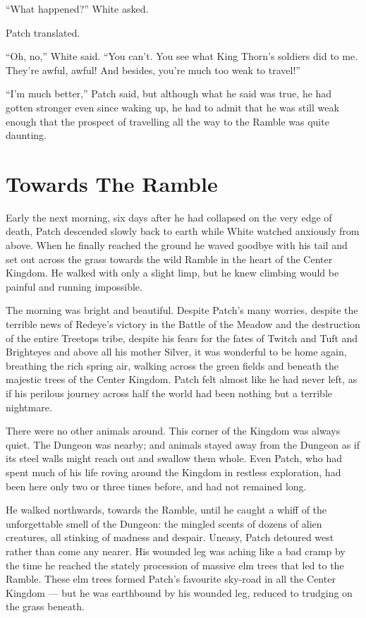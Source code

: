 \documentclass[ebook,oneside,openany,17pt]{memoir}
\renewcommand{\thechapter}{\Roman{chapter}}
\newcounter{sections}
\newcommand{\sections}[1]{%
  \section*{#1}
  \addtocounter{sections}{1}%
  \pdfbookmark[1]{#1}{section.\thechapter.\thesections}}
\begin{document}
“What happened?” White asked.

Patch translated.

“Oh, no,” White said. “You can’t. You see what King Thorn’s soldiers
did to me. They’re awful, awful! And besides, you’re much too weak to
travel!”

“I’m much better,” Patch said, but although what he said was true, he
had gotten stronger even since waking up, he had to admit that he was
still weak enough that the prospect of travelling all the way to the
Ramble was quite daunting.


\sections{Towards The Ramble}

Early the next morning, six days after he had collapsed on the very
edge of death, Patch descended slowly back to earth while White
watched anxiously from above. When he finally reached the ground he
waved goodbye with his tail and set out across the grass towards the
wild Ramble in the heart of the Center Kingdom. He walked with only a
slight limp, but he knew climbing would be painful and running
impossible.

The morning was bright and beautiful. Despite Patch’s many worries,
despite the terrible news of Redeye’s victory in the Battle of the
Meadow and the destruction of the entire Treetops tribe, despite his
fears for the fates of Twitch and Tuft and Brighteyes and above all
his mother Silver, it was wonderful to be home again, breathing the
rich spring air, walking across the green fields and beneath the
majestic trees of the Center Kingdom. Patch felt almost like he had
never left, as if his perilous journey across half the world had been
nothing but a terrible nightmare.

There were no other animals around. This corner of the Kingdom was
always quiet. The Dungeon was nearby; and animals stayed away from the
Dungeon as if its steel walls might reach out and swallow them
whole. Even Patch, who had spent much of his life roving around the
Kingdom in restless exploration, had been here only two or three times
before, and had not remained long.

He walked northwards, towards the Ramble, until he caught a whiff of
the unforgettable smell of the Dungeon: the mingled scents of dozens
of alien creatures, all stinking of madness and despair. Uneasy, Patch
detoured west rather than come any nearer. His wounded leg was aching
like a bad cramp by the time he reached the stately procession of
massive elm trees that led to the Ramble. These elm trees formed
Patch’s favourite sky-road in all the Center Kingdom — but he was
earthbound by his wounded leg, reduced to trudging on the grass
beneath.
\end{document}
